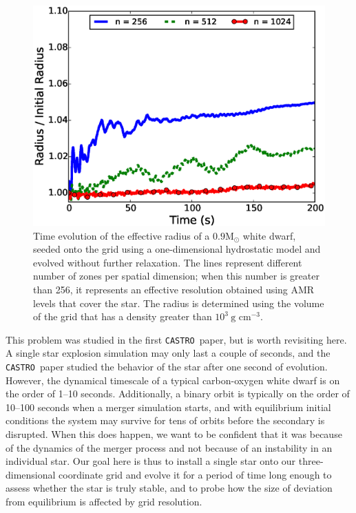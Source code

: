 \documentclass[iop]{../emulateapj}
\newcommand{\msolar}{\mathrm{M}_\odot}
\newcommand{\castro}{\texttt{CASTRO}}
\begin{document}
\begin{figure}
  \centering
  \includegraphics[scale=0.45]{plots/single_star_static_1e3_radius}
  \caption{Time evolution of the effective radius of a $0.9 \msolar$ 
    white dwarf, seeded onto the grid using a one-dimensional hydrostatic
    model and evolved without further relaxation. The lines represent 
    different number of zones per spatial dimension; when this number is 
    greater than 256, it represents an effective resolution obtained 
    using AMR levels that cover the star. The radius is determined 
    using the volume of the grid that has a density greater than $10^3\ \text{g cm}^{-3}.$
    \label{fig:single_star_static_radius}}
\end{figure}

This problem was studied in the first \castro\ paper, but is worth
revisiting here. A single star explosion simulation may only last a
couple of seconds, and the \castro\ paper studied the behavior of the
star after one second of evolution. However, the dynamical timescale
of a typical carbon-oxygen white dwarf is on the order of 1--10
seconds. Additionally, a binary orbit is typically on the order of
10--100 seconds when a merger simulation starts, and with equilibrium
initial conditions the system may survive for tens of orbits before
the secondary is disrupted. When this does happen, we want to be
confident that it was because of the dynamics of the merger process
and not because of an instability in an individual star. Our goal here
is thus to install a single star onto our three-dimensional
coordinate grid and evolve it for a period of time long enough to
assess whether the star is truly stable, and to probe how the size of
deviation from equilibrium is affected by grid resolution.
\end{document}
